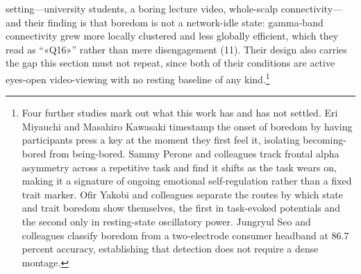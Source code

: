 setting---university students, a boring lecture video, whole-scalp connectivity---and their
finding is that boredom is not a network-idle state: gamma-band connectivity grew more locally
clustered and less globally efficient, which they read as ``«Q16»'' rather than mere
disengagement (11). Their design also carries the gap this section must not repeat, since both
of their conditions are active eyes-open video-viewing with no resting baseline of any
kind.\footnote{Four further studies mark out what this work has and has not settled. Eri
Miyauchi and Masahiro Kawasaki timestamp the onset of boredom by having participants press a
key at the moment they first feel it, isolating becoming-bored from being-bored. Sammy Perone
and colleagues track frontal alpha asymmetry across a repetitive task and find it shifts as
the task wears on, making it a signature of ongoing emotional self-regulation rather than a
fixed trait marker. Ofir Yakobi and colleagues separate the routes by which state and trait
boredom show themselves, the first in task-evoked potentials and the second only in
resting-state oscillatory power. Jungryul Seo and colleagues classify boredom from a
two-electrode consumer headband at 86.7 percent accuracy, establishing that detection does not
require a dense montage.}
